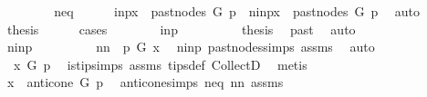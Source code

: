 \begin{isabellebody}
\ \ \isamarkupfalse%
\isanewline
\ \ \ \ \isamarkupfalse%
\ neq\isanewline
\ \ \ \ \isamarkupfalse%
\ {\isacharparenleft}{\kern0pt}in{\isacharunderscore}{\kern0pt}p{\isacharparenright}{\kern0pt}{\isachardoublequoteopen}x\ {\isasymin}\ past{\isacharunderscore}{\kern0pt}nodes\ G\ p{\isachardoublequoteclose}\ {\isacharbar}{\kern0pt}\ {\isacharparenleft}{\kern0pt}nin{\isacharunderscore}{\kern0pt}p{\isacharparenright}{\kern0pt}{\isachardoublequoteopen}x\ {\isasymnotin}\ past{\isacharunderscore}{\kern0pt}nodes\ G\ p{\isachardoublequoteclose}\ \isamarkupfalse%
\ auto\isanewline
\ \ \ \ \isamarkupfalse%
\ \isamarkupfalse%
\ {\isacharquery}{\kern0pt}thesis\ \isanewline
\ \ \ \ \isamarkupfalse%
{\isacharparenleft}{\kern0pt}cases{\isacharparenright}{\kern0pt}\isanewline
\ \ \ \ \ \ \isamarkupfalse%
\ in{\isacharunderscore}{\kern0pt}p\isanewline
\ \ \ \ \ \ \isamarkupfalse%
\ \isamarkupfalse%
\ {\isacharquery}{\kern0pt}thesis\ \isamarkupfalse%
\ past\ \isamarkupfalse%
\ auto\isanewline
\ \ \ \ \isamarkupfalse%
\isanewline
\ \ \ \ \ \ \isamarkupfalse%
\ nin{\isacharunderscore}{\kern0pt}p\isanewline
\ \ \ \ \ \ \isamarkupfalse%
\ \isamarkupfalse%
\ nn{\isacharcolon}{\kern0pt}\ {\isachardoublequoteopen}{\isasymnot}\ p\ {\isasymrightarrow}\isactrlsup {\isacharplus}{\kern0pt}\isactrlbsub G\isactrlesub \ x{\isachardoublequoteclose}\ \isamarkupfalse%
\ nin{\isacharunderscore}{\kern0pt}p\ past{\isacharunderscore}{\kern0pt}nodes{\isachardot}{\kern0pt}simps\ assms{\isacharparenleft}{\kern0pt}{}{\isacharparenright}{\kern0pt}\ \isamarkupfalse%
\ auto\isanewline
\ \ \ \ \ \ \isamarkupfalse%
\ {\isachardoublequoteopen}{\isasymnot}\ x\ {\isasymrightarrow}\isactrlsup {\isacharplus}{\kern0pt}\isactrlbsub G\isactrlesub \ p{\isachardoublequoteclose}\ \isamarkupfalse%
\ is{\isacharunderscore}{\kern0pt}tip{\isachardot}{\kern0pt}simps\ assms\ tips{\isacharunderscore}{\kern0pt}def\ CollectD\ \isamarkupfalse%
\ metis\ \ \ \ \ \ \ \ \ \ \isanewline
\ \ \ \ \ \ \isamarkupfalse%
\ \isamarkupfalse%
\ {\isachardoublequoteopen}x\ {\isasymin}\ anticone\ G\ p{\isachardoublequoteclose}\ \isamarkupfalse%
\ anticone{\isachardot}{\kern0pt}simps\ neq\ nn\ assms{\isacharparenleft}{\kern0pt}{}{\isacharparenright}{\kern0pt}\ \isamarkupfalse%

\end{isabellebody}
